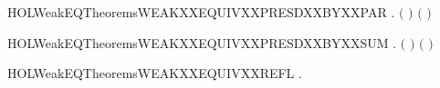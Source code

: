 \begin{SaveVerbatim}{HOLWeakEQTheoremsWEAKXXEQUIVXXPRESDXXBYXXPAR}
\HOLTokenTurnstile{} \HOLSymConst{\HOLTokenForall{}}   .
          \HOLSymConst{\HOLTokenConj{}}    \HOLSymConst{\HOLTokenImp{}}
        \ensuremath{(} \HOLSymConst{\ensuremath{\mid}} \ensuremath{)} \ensuremath{(} \HOLSymConst{\ensuremath{\mid}} \ensuremath{)}
\end{SaveVerbatim}
\newcommand{\HOLWeakEQTheoremsWEAKXXEQUIVXXPRESDXXBYXXPAR}{\UseVerbatim{HOLWeakEQTheoremsWEAKXXEQUIVXXPRESDXXBYXXPAR}}
\begin{SaveVerbatim}{HOLWeakEQTheoremsWEAKXXEQUIVXXPRESDXXBYXXSUM}
\HOLTokenTurnstile{} \HOLSymConst{\HOLTokenForall{}}   .
          \HOLSymConst{\HOLTokenConj{}}   \HOLSymConst{\HOLTokenConj{}}   \HOLSymConst{\HOLTokenConj{}}
          \HOLSymConst{\HOLTokenConj{}}   \HOLSymConst{\HOLTokenConj{}}   \HOLSymConst{\HOLTokenImp{}}
        \ensuremath{(} \HOLSymConst{\ensuremath{+}} \ensuremath{)} \ensuremath{(} \HOLSymConst{\ensuremath{+}} \ensuremath{)}
\end{SaveVerbatim}
\newcommand{\HOLWeakEQTheoremsWEAKXXEQUIVXXPRESDXXBYXXSUM}{\UseVerbatim{HOLWeakEQTheoremsWEAKXXEQUIVXXPRESDXXBYXXSUM}}
\begin{SaveVerbatim}{HOLWeakEQTheoremsWEAKXXEQUIVXXREFL}
\HOLTokenTurnstile{} \HOLSymConst{\HOLTokenForall{}}.   
\end{SaveVerbatim}
